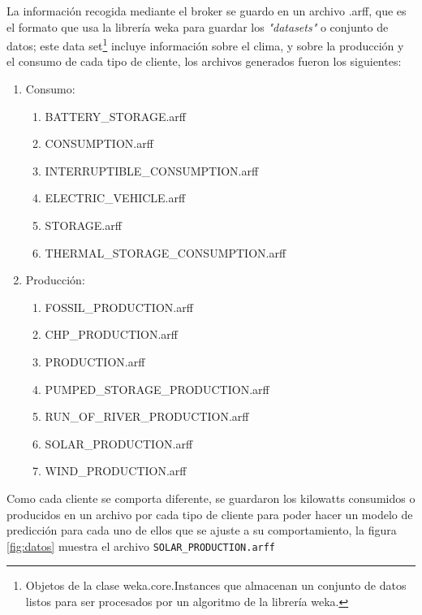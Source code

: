 La información recogida mediante el broker se guardo en un archivo .arff, que es el formato que usa la librería weka para guardar los \textit{"datasets"} o conjunto de datos; este data set\footnote{Objetos de la clase weka.core.Instances que almacenan un conjunto de datos listos para ser procesados por un algoritmo de la librería weka.} incluye información sobre el clima, y sobre la producción y el consumo de cada tipo de cliente, los archivos generados fueron los siguientes: 

\renewcommand{\labelenumi}{$\bullet$ }
\renewcommand{\labelenumii}{$\bullet$ }
\begin{enumerate}
	\item Consumo:
	\begin{enumerate}
		\item BATTERY\_STORAGE.arff
		\item CONSUMPTION.arff
		\item INTERRUPTIBLE\_CONSUMPTION.arff
		\item ELECTRIC\_VEHICLE.arff
		\item STORAGE.arff
		\item THERMAL\_STORAGE\_CONSUMPTION.arff
	\end{enumerate}
	\item Producción: 
	\begin{enumerate}
		\item FOSSIL\_PRODUCTION.arff
		\item CHP\_PRODUCTION.arff
		\item PRODUCTION.arff
		\item PUMPED\_STORAGE\_PRODUCTION.arff
		\item RUN\_OF\_RIVER\_PRODUCTION.arff
		\item SOLAR\_PRODUCTION.arff
		\item WIND\_PRODUCTION.arff
	\end{enumerate}
\end{enumerate}

Como cada cliente se comporta diferente, se guardaron los kilowatts consumidos o producidos en un archivo por cada tipo de cliente para poder hacer un modelo de predicción para cada uno de ellos que se ajuste a su comportamiento, la figura \ref{fig:datos} muestra el archivo \texttt{SOLAR\_PRODUCTION.arff} 

